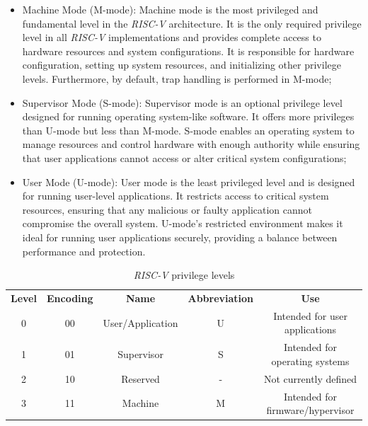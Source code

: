 \begin{itemize}
  \item Machine Mode (M-mode): Machine mode is the most privileged and
    fundamental level in the \textit{RISC-V} architecture. It is the only
    required privilege level in all \textit{RISC-V} implementations and provides
    complete access to hardware resources and system configurations. It is
    responsible for hardware configuration, setting up system resources, and
    initializing other privilege levels. Furthermore, by default, trap handling is
    performed in M-mode;

  \item Supervisor Mode (S-mode): Supervisor mode is an optional privilege level
    designed for running operating system-like software. It offers more privileges
    than U-mode but less than M-mode. S-mode enables an operating system to
    manage resources and control hardware with enough authority while ensuring
    that user applications cannot access or alter critical system configurations;

  \item User Mode (U-mode): User mode is the least privileged level and is
    designed for running user-level applications. It restricts access to critical
    system resources, ensuring that any malicious or faulty application cannot
    compromise the overall system. U-mode's restricted environment makes it ideal
    for running user applications securely, providing a balance between
    performance and protection.
\end{itemize}

\begin{table}
  \centering
  \begin{tabular}{|c|c|c|c|c|}
    \hline
    \textbf{Level}   & \textbf{Encoding} & \textbf{Name}    & \textbf{Abbreviation} & \textbf{Use}                     \\
    \hhline{=====} 0 & 00                & User/Application & U                     & Intended for user applications   \\
    \hline
    1                & 01                & Supervisor       & S                     & Intended for operating systems   \\
    \hline
    2                & 10                & Reserved         & -                     & Not currently defined            \\
    \hline
    3                & 11                & Machine          & M                     & Intended for firmware/hypervisor \\
    \hline
  \end{tabular}
  \caption{\textit{RISC-V} privilege levels}
  \label{tab:priv}
\end{table}

